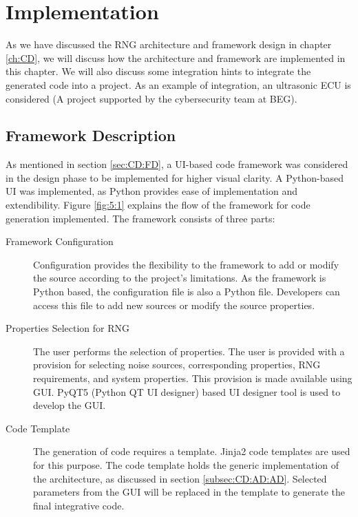 \chapter{Implementation}
\label{ch:Imp}
As we have discussed the RNG architecture and framework design in chapter \ref{ch:CD}, we will discuss how the architecture and framework are implemented in this chapter. We will also discuss some integration hints to integrate the generated code into a project. As an example of integration, an ultrasonic ECU is considered (A project supported by the cybersecurity team at BEG).

%
%
\section{Framework Description}
\label{sec:Imp:FD}
As mentioned in section \ref{sec:CD:FD}, a UI-based code framework was considered in the design phase to be implemented for higher visual clarity. A Python-based UI was implemented, as Python provides ease of implementation and extendibility. Figure \ref{fig:5:1} explains the flow of the framework for code generation implemented. The framework consists of three parts:

\begin{description}
	\item[Framework Configuration] Configuration provides the flexibility to the framework to add or modify the source according to the project’s limitations. As the framework is Python based, the configuration file is also a Python file. Developers can access this file to add new sources or modify the source properties.
	
	\item[Properties Selection for RNG] The user performs the selection of properties. The user is provided with a provision for selecting noise sources, corresponding properties, RNG requirements, and system properties. This provision is made available using GUI. PyQT5 (Python QT UI designer) based UI designer tool is used to develop the GUI.
	
	\item[Code Template] The generation of code requires a template. Jinja2 code templates are used for this purpose. The code template holds the generic implementation of the architecture, as discussed in section \ref{subsec:CD:AD:AD}. Selected parameters from the GUI will be replaced in the template to generate the final integrative code.
\end{description}

